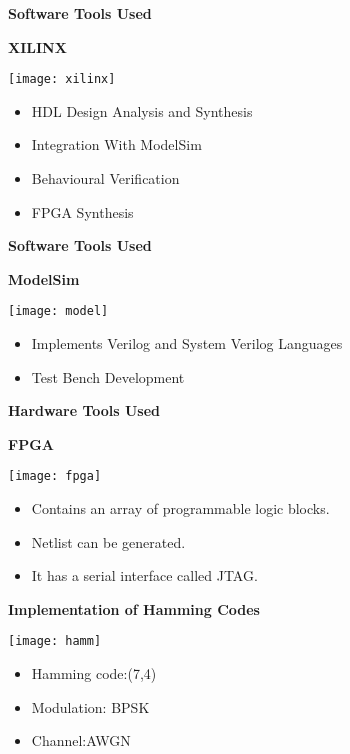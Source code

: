 \documentclass{beamer}
\begin{document}
\begin{frame}{\scriptsize \LARGE \centering \textbf{Software Tools Used}}
\begin{block}{\textbf{XILINX}}
\begin{center}
\texttt{[image: xilinx]}
\begin{itemize}
\item HDL Design Analysis and Synthesis
\item Integration With ModelSim
\item Behavioural Verification
\item FPGA Synthesis
\end{itemize}
\end{center}
\end{block}
\end{frame}

\begin{frame}{\scriptsize \LARGE \centering \textbf{Software Tools Used}}
\begin{block}{\textbf {ModelSim}}
\begin{center}
\texttt{[image: model]}
\end{center}
\begin{itemize}
\item Implements Verilog and System Verilog Languages
\item Test Bench Development
\end{itemize}

\end{block}
\end{frame}


\begin{frame}{\scriptsize \LARGE \centering \textbf{Hardware Tools Used}}
\begin{block}{\textbf{FPGA}}
\begin{center}
\texttt{[image: fpga]}
\end{center}
\begin{itemize}
\item Contains an array of programmable logic blocks. 
\item Netlist can be generated.
\item It has a serial interface called JTAG.
\end{itemize}

\end{block}
\end{frame}

\begin{frame}{\scriptsize \LARGE \centering \textbf{Implementation of Hamming Codes}}
\begin{center}
	\texttt{[image: hamm]}
\end{center}
\begin{itemize}
\item Hamming code:(7,4)
	\item Modulation: BPSK 
\item Channel:AWGN
\end{itemize}
\end{frame}
\end{document}
